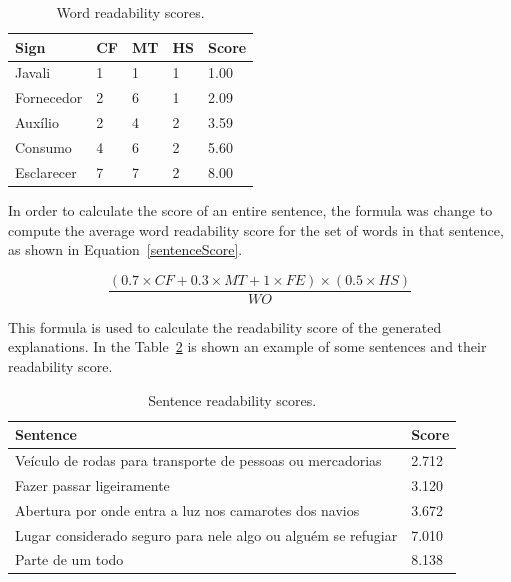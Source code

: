 \begin{table}[H]
    \centering
    \caption{Word readability scores.}
    \label{table:signs}
    \begin{tabular}{l|l|l|l|l}
        {\bfseries Sign} & {\bfseries CF} & {\bfseries MT} & {\bfseries HS} & {\bfseries Score} \\
        \hline
        Javali & 1 & 1 & 1 & 1.00  \\
        \hline
        Fornecedor & 2 & 6 & 1 & 2.09  \\
        \hline
        Auxílio & 2 & 4 & 2 & 3.59 \\
        \hline
        Consumo & 4 & 6 & 2 & 5.60 \\
        \hline
        Esclarecer & 7 & 7 & 2 & 8.00 \\
    \end{tabular}
\end{table}

In order to calculate the score of an entire sentence, the formula was change to compute the average word readability score for the set of words in that sentence, as shown in Equation~\ref{sentenceScore}.

\begin{equation}
    \frac{(0.7 \times CF + 0.3 \times MT + 1 \times FE) \times (0.5 \times HS)}{WO}
\label{sentenceScore}
\end{equation}

This formula is used to calculate the readability score of the generated explanations.
In the Table~\ref{table:sentences} is shown an example of some sentences and their readability score.

\begin{table}[H]
    \centering
    \caption{Sentence readability scores.}
    \label{table:sentences}
    \begin{tabular}{l|l}
        {\bfseries Sentence} & {\bfseries Score} \\
        \hline
        Veículo de rodas para transporte de pessoas ou mercadorias & 2.712  \\
        \hline
        Fazer passar ligeiramente & 3.120  \\
        \hline
        Abertura por onde entra a luz nos camarotes dos navios & 3.672 \\
        \hline
        Lugar considerado seguro para nele algo ou alguém se refugiar & 7.010 \\
        \hline
        Parte de um todo & 8.138 \\
    \end{tabular}
\end{table}

